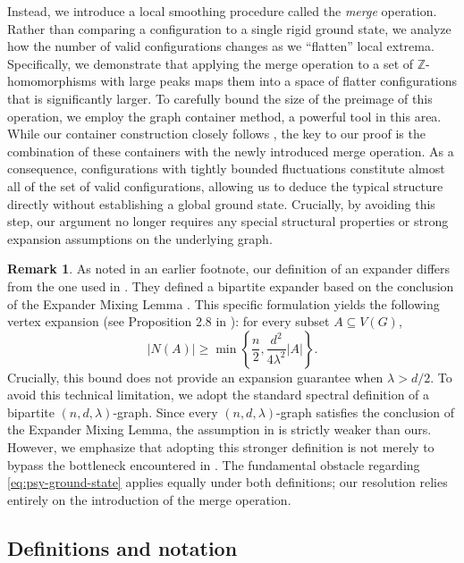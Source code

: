 \documentclass{amsart}
\theoremstyle{definition}
\newtheorem{remark}[thm]{Remark}
\newcommand{\0}[0]{\emptyset}
\begin{document}
Instead, we introduce a local smoothing procedure called the \textit{merge} operation. Rather than comparing a configuration to a single rigid ground state, we analyze how the number of valid configurations changes as we ``flatten'' local extrema. Specifically, we demonstrate that applying the merge operation to a set of $\mathbb{Z}$-homomorphisms with large peaks maps them into a space of flatter configurations that is significantly larger. To carefully bound the size of the preimage of this operation, we employ the graph container method, a powerful tool in this area. While our container construction closely follows  \cite{galvin2003homomorphisms}, the key to our proof is the combination of these containers with the newly introduced merge operation. As a consequence, configurations with tightly bounded fluctuations constitute almost all of the set of valid configurations, allowing us to deduce the typical structure directly without establishing a global ground state. Crucially, by avoiding this step, our argument no longer requires any special structural properties or strong expansion assumptions on the underlying graph.

\begin{remark}\label{rmk:expander}
As noted in an earlier footnote, our definition of an expander differs from the one used in  \cite{peled2013lipschitz}. They defined a bipartite expander based on the conclusion of the Expander Mixing Lemma \cite{alon1988explicit}. This specific formulation yields the following vertex expansion (see Proposition 2.8 in \cite{peled2013lipschitz}): for every subset $A \subseteq V(G)$,
\[
    |N(A)| \ge \min \left\{ \frac{n}{2}, \frac{d^2}{4\lambda^2}|A| \right\}.
\]
Crucially, this bound does not provide an expansion guarantee when $\lambda>d/2$. To avoid this technical limitation, we adopt the standard spectral definition of a bipartite $(n,d,\lambda)$-graph. Since every $(n,d,\lambda)$-graph satisfies the conclusion of the Expander Mixing Lemma, the assumption in \cite{peled2013lipschitz} is strictly weaker than ours. However, we emphasize that adopting this stronger definition is not merely to bypass the bottleneck encountered in \cite{krueger2024lipschitz, peled2013lipschitz}. The fundamental obstacle regarding \eqref{eq:psy-ground-state} applies equally under both definitions; our resolution relies entirely on the introduction of the merge operation.
\end{remark}

\subsection*{Definitions and notation} 
\end{document}
